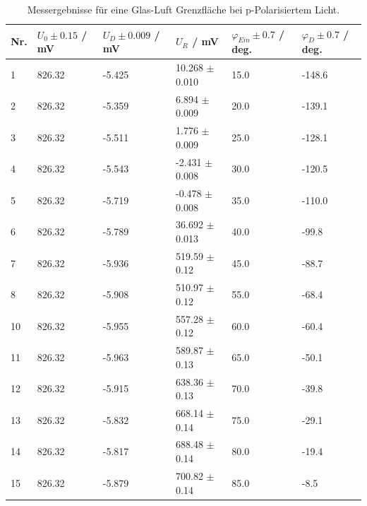 \documentclass[12pt,a4paper,twoside]{article}
\begin{document}
\begin{table}[H]
    \centering
    \caption{Messergebnisse für eine Glas-Luft Grenzfläche bei p-Polarisiertem Licht. }
    \label{tab:mess glas luft p-pol}
    \begin{tabular}{| l | l | l | l | l | l |}
        \hline
        Nr. & $U_0 \pm 0.15 $ / mV & $U_D \pm 0.009$ / mV & $U_{R}$ / mV & $\varphi_{Ein} \pm 0.7$ / deg. & $\varphi_D \pm 0.7$ / deg.  \\
        \hline
        1  & 826.32 & -5.425 & 10.268 $\pm$ 0.010 & 15.0 & -148.6 \\
        2  & 826.32 & -5.359 & 6.894  $\pm$ 0.009 & 20.0 & -139.1 \\
        3  & 826.32 & -5.511 & 1.776  $\pm$ 0.009 & 25.0 & -128.1 \\
        4  & 826.32 & -5.543 & -2.431 $\pm$ 0.008 & 30.0 & -120.5 \\
        5  & 826.32 & -5.719 & -0.478 $\pm$ 0.008 & 35.0 & -110.0 \\
        6  & 826.32 & -5.789 & 36.692 $\pm$ 0.013 & 40.0 & -99.8  \\
        7  & 826.32 & -5.936 & 519.59 $\pm$ 0.12 & 45.0 & -88.7  \\
        8  & 826.32 & -5.908 & 510.97 $\pm$ 0.12 & 55.0 & -68.4  \\
        10 & 826.32 & -5.955 & 557.28 $\pm$ 0.12 & 60.0 & -60.4  \\
        11 & 826.32 & -5.963 & 589.87 $\pm$ 0.13 & 65.0 & -50.1  \\
        12 & 826.32 & -5.915 & 638.36 $\pm$ 0.13 & 70.0 & -39.8  \\
        13 & 826.32 & -5.832 & 668.14 $\pm$ 0.14 & 75.0 & -29.1  \\
        14 & 826.32 & -5.817 & 688.48 $\pm$ 0.14 & 80.0 & -19.4  \\
        15 & 826.32 & -5.879 & 700.82 $\pm$ 0.14 & 85.0 & -8.5   \\
        \hline
    \end{tabular}
\end{table}
\end{document}
